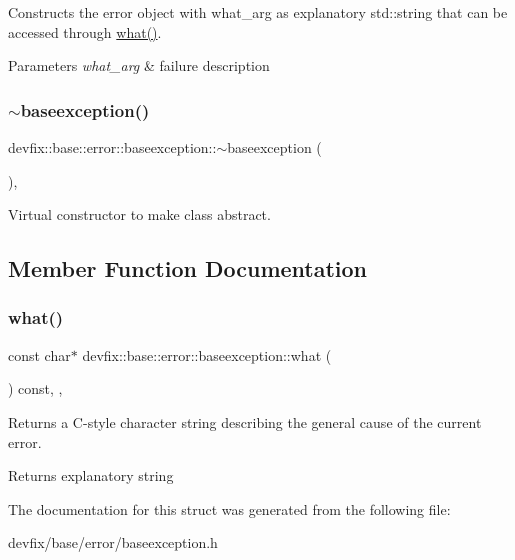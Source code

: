 Constructs the error object with what\+\_\+arg as explanatory std\+::string that can be accessed through \hyperlink{structdevfix_1_1base_1_1error_1_1baseexception_a16327152a55d65b1e537825231fbd452}{what()}. 
\begin{DoxyParams}{Parameters}
{\em what\+\_\+arg} & failure description \\
\hline
\end{DoxyParams}
\mbox{\label{structdevfix_1_1base_1_1error_1_1baseexception_a3ae67c736d3268683cb92556c9f14bd7}} 
\subsubsection{\texorpdfstring{$\sim$baseexception()}{~baseexception()}}
{\footnotesize\ttfamily devfix\+::base\+::error\+::baseexception\+::$\sim$baseexception (\begin{DoxyParamCaption}{ }\end{DoxyParamCaption})\hspace{0.3cm}{\ttfamily [override]}, {\ttfamily [default]}}

Virtual constructor to make class abstract. 

\subsection{Member Function Documentation}
\mbox{\label{structdevfix_1_1base_1_1error_1_1baseexception_a16327152a55d65b1e537825231fbd452}} 
\subsubsection{\texorpdfstring{what()}{what()}}
{\footnotesize\ttfamily const char$\ast$ devfix\+::base\+::error\+::baseexception\+::what (\begin{DoxyParamCaption}{ }\end{DoxyParamCaption}) const\hspace{0.3cm}{\ttfamily [inline]}, {\ttfamily [final]}, {\ttfamily [noexcept]}}

Returns a C-\/style character string describing the general cause of the current error. \begin{DoxyReturn}{Returns}
explanatory string 
\end{DoxyReturn}


The documentation for this struct was generated from the following file\+:\begin{DoxyCompactItemize}
\item 
devfix/base/error/baseexception.\+h\end{DoxyCompactItemize}

